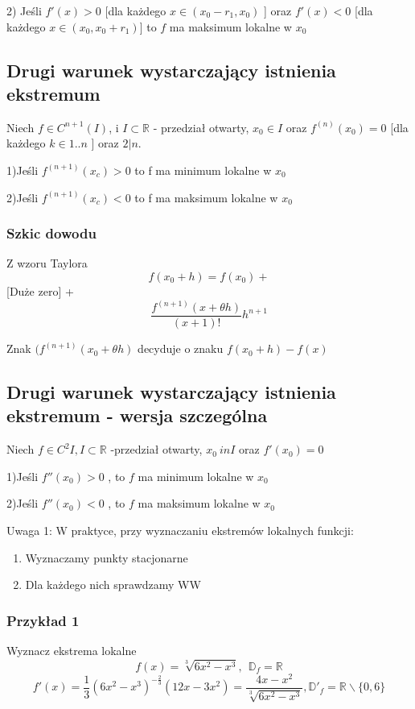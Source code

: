 \documentclass{article}
\begin{document}
2) Jeśli $f'(x) > 0$ [dla każdego $x \in (x_0 - r_1 , x_0)$ ] oraz $f'(x) < 0$ [dla każdego $x \in (x_0,x_0+r_1)$] to $f$ ma maksimum lokalne w $x_0$

\subsection{ Drugi warunek wystarczający istnienia ekstremum}
Niech $f \in C^{n+1}(I)$, i $ I\subset \mathbb{R} $ - przedział otwarty, $ x_0 \in I $ oraz $ f^{(n)}(x_0) = 0 $ [dla każdego $k \in {1..n}$ ] oraz $2|n$.

1)Jeśli $f^{(n+1)}(x_c) > 0$ to f ma minimum lokalne w $x_0$

2)Jeśli $f^{(n+1)}(x_c) < 0$ to f ma maksimum lokalne w $x_0$

\newpage
\subsubsection{Szkic dowodu}
Z wzoru Taylora
$$f(x_0 + h) = f(x_0) + $$ [Duże zero] + $$\frac{f^{(n+1)}(x + \theta h)}{(x+1)!}h^{n+1}$$

Znak $(f^{(n+1)}(x_0 + \theta h)$ decyduje o znaku $f(x_0 +h) - f(x)$

\subsection{ Drugi warunek wystarczający istnienia ekstremum - wersja szczególna}

Niech $f \in C^2{I}, I \subset \mathbb{R}$ -przedział otwarty, $x_0 \ in I$ oraz $f'(x_0) = 0$

1)Jeśli $f''(x_0) > 0$ , to $f$ ma minimum lokalne w $x_0$

2)Jeśli $f''(x_0) < 0$ , to $f$ ma maksimum lokalne w $x_0$

Uwaga 1: W praktyce, przy wyznaczaniu ekstremów lokalnych funkcji:
\begin{enumerate}
\item{Wyznaczamy punkty stacjonarne}
\item{Dla każdego nich sprawdzamy WW}
\end{enumerate}

\subsubsection{Przykład 1}
Wyznacz ekstrema lokalne
$$f(x) = \sqrt[3]{6x^2 - x^3}, \ \ \mathbb{D}_f = \mathbb{R}$$
$$f'(x) = \frac{1}{3}(6x^2 -x^3)^{-\frac{2}{3}}(12x -3x^2) = \frac{4x-x^2}{\sqrt[3]{6x^2 - x^3}}, \mathbb{D}'_f = \mathbb{R} \backslash \{0,6\} $$
\end{document}
